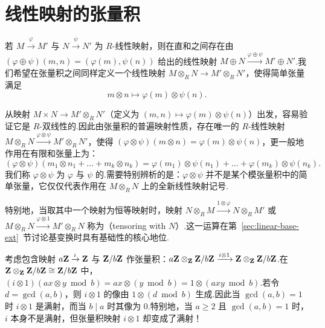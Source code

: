 \section{线性映射的张量积}
\label{sec:linear-maps}

若 $M \xrightarrow{\varphi} M'$ 与 $N \xrightarrow{\psi} N'$ 为 $R$-线性映射，则在直和之间存在由 $(\varphi \oplus \psi)(m, n) = (\varphi(m), \psi(n))$ 给出的线性映射 $M \oplus N \xrightarrow{\varphi \oplus \psi} M' \oplus N'$.我们希望在张量积之间同样定义一个线性映射 $M \otimes_R N \to M' \otimes_R N'$，使得简单张量满足
\[
  m \otimes n \mapsto \varphi(m) \otimes \psi(n).
\]

从映射 $M \times N \to M' \otimes_R N'$（定义为 $(m, n) \mapsto \varphi(m) \otimes \psi(n)$）出发，容易验证它是 $R$-双线性的.因此由张量积的普遍映射性质，存在唯一的 $R$-线性映射 $M \otimes_R N \xrightarrow{\varphi \otimes \psi} M' \otimes_R N'$，使得 $(\varphi \otimes \psi)(m \otimes n) = \varphi(m) \otimes \psi(n)$，更一般地作用在有限和张量上为：
\[
  (\varphi \otimes \psi)(m_1 \otimes n_1 + \dots + m_k \otimes n_k) = \varphi(m_1) \otimes \psi(n_1) + \dots + \varphi(m_k) \otimes \psi(n_k).
\]
我们称 $\varphi \otimes \psi$ 为 $\varphi$ 与 $\psi$ 的.需要特别辨析的是：$\varphi \otimes \psi$ 并不是某个模张量积中的简单张量，它仅仅代表作用在 $M \otimes_R N$ 上的全新线性映射记号.

特别地，当取其中一个映射为恒等映射时，映射 $N \otimes_R M \xrightarrow{1 \otimes \varphi} N \otimes_R M'$ 或 $M \otimes_R N \xrightarrow{\varphi \otimes 1} M' \otimes_R N$ 称为（tensoring with $N$）.这一运算在第~\ref{sec:linear-base-ext}~节讨论基变换时具有基础性的核心地位.

\begin{example}\label{ex:inclusion-tensor}
考虑包含映射 $a\mathbf{Z} \xrightarrow{i} \mathbf{Z}$ 与 $\mathbf{Z}/b\mathbf{Z}$ 作张量积：$a\mathbf{Z} \otimes_{\mathbf{Z}} \mathbf{Z}/b\mathbf{Z} \xrightarrow{i \otimes 1} \mathbf{Z} \otimes_{\mathbf{Z}} \mathbf{Z}/b\mathbf{Z}$.在 $\mathbf{Z} \otimes_{\mathbf{Z}} \mathbf{Z}/b\mathbf{Z} \cong \mathbf{Z}/b\mathbf{Z}$ 中，$(i \otimes 1)(ax \otimes y \bmod b) = ax \otimes (y \bmod b) = 1 \otimes (axy \bmod b)$.若令 $d = \gcd(a, b)$，则 $i \otimes 1$ 的像由 $1 \otimes (d \bmod b)$ 生成.因此当 $\gcd(a, b) = 1$ 时 $i \otimes 1$ 是满射，而当 $b \mid a$ 时其像为 $0$.特别地，当 $a \geq 2$ 且 $\gcd(a, b) = 1$ 时，$i$ 本身不是满射，但张量积映射 $i \otimes 1$ 却变成了满射！
\end{example}

